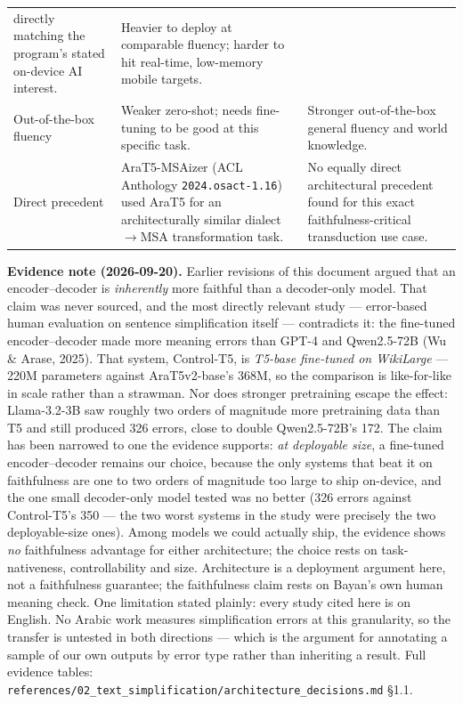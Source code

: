\documentclass[11pt,a4paper]{article}
\begin{document}
\begin{center}
\begin{tabular}{@{}p{4.6cm}p{5.6cm}p{5.6cm}@{}}
directly matching the program's stated on-device AI interest. &
Heavier to deploy at comparable fluency; harder to hit real-time,
low-memory mobile targets. \\
\addlinespace
Out-of-the-box fluency &
Weaker zero-shot; needs fine-tuning to be good at this specific task. &
Stronger out-of-the-box general fluency and world knowledge. \\
\addlinespace
Direct precedent &
AraT5-MSAizer (ACL Anthology \texttt{2024.osact-1.16}) used AraT5 for an
architecturally similar dialect$\to$MSA transformation task. &
No equally direct architectural precedent found for this exact
faithfulness-critical transduction use case. \\
\bottomrule
\end{tabular}
\end{center}

\begin{noteb}
\textbf{Evidence note (2026-09-20).} Earlier revisions of this document argued
that an encoder--decoder is \emph{inherently} more faithful than a decoder-only
model. That claim was never sourced, and the most directly relevant study ---
error-based human evaluation on sentence simplification itself --- contradicts
it: the fine-tuned encoder--decoder made more meaning errors than GPT-4 and
Qwen2.5-72B (Wu \& Arase, 2025). That system, Control-T5, is \emph{T5-base
fine-tuned on WikiLarge} --- 220M parameters against AraT5v2-base's 368M, so the
comparison is like-for-like in scale rather than a strawman. Nor does stronger
pretraining escape the effect: Llama-3.2-3B saw roughly two orders of magnitude
more pretraining data than T5 and still produced 326 errors, close to double
Qwen2.5-72B's 172. The claim has been narrowed to one the evidence
supports: \emph{at deployable size}, a fine-tuned encoder--decoder remains our
choice, because the only systems that beat it on faithfulness are one to two
orders of magnitude too large to ship on-device, and the one small decoder-only
model tested was no better (326 errors against Control-T5's 350 --- the two
worst systems in the study were precisely the two deployable-size ones).
Among models we could actually ship, the evidence shows \emph{no} faithfulness
advantage for either architecture; the choice rests on task-nativeness,
controllability and size. Architecture is a deployment argument here, not a
faithfulness guarantee; the faithfulness claim rests on Bayan's own human
meaning check. One limitation stated plainly: every study cited here is on
English. No Arabic work measures simplification errors at this granularity, so
the transfer is untested in both directions --- which is the argument for
annotating a sample of our own outputs by error type rather than inheriting a
result.
Full evidence tables: \texttt{references/02\_text\_simplification/architecture\_decisions.md} §1.1.
\end{noteb}
\end{document}
